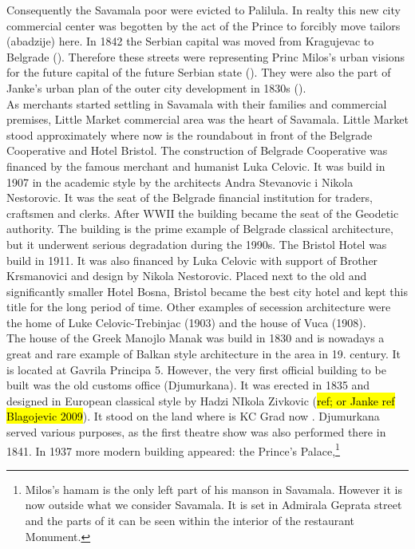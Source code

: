 \documentclass[11pt]{report}
\begin{document}
Consequently the Savamala poor were evicted to Palilula. 
In realty this new city commercial center was begotten by the act of the Prince to forcibly move tailors (abadzije) here.
In 1842 the Serbian capital was moved from Kragujevac to Belgrade (\cite{Roter Blagojevic in Doytchinov 2015}).
Therefore these streets were representing Princ Milos’s urban visions for the future capital of the future Serbian state (\cite{Roter Blagojevic in Doytchinov 2015}).
They were also the part of Janke’s urban plan of the outer city development in 1830s (\cite{Blagojevic 2009}). 
\\
As merchants started settling in Savamala with their families and commercial premises, Little Market commercial area was the heart of Savamala.
Little Market stood approximately where now is the roundabout in front of the Belgrade Cooperative and Hotel Bristol.
The construction of Belgrade Cooperative was financed by the famous merchant and humanist Luka Celovic.
It was build in 1907 in the academic style by the architects Andra Stevanovic i Nikola Nestorovic.
It was the seat of the Belgrade financial institution for traders, craftsmen and clerks.
After WWII the building became the seat of the Geodetic authority.
The building is the prime example of Belgrade classical architecture, but it underwent serious degradation during the 1990s.
The Bristol Hotel was build in 1911.
It was also financed by Luka Celovic with support of Brother Krsmanovici and design by Nikola Nestorovic. Placed next to the old and significantly smaller Hotel Bosna, Bristol became the best city hotel and kept this title for the long period of time.
Other examples of secession architecture were the home of Luke Celovic-Trebinjac (1903) and the house of Vuca (1908).
\\
The house of the Greek Manojlo Manak was build in 1830 and is nowadays a great and rare example of Balkan style architecture in the area in 19. century. It is located at Gavrila Principa 5.
However, the very first official building to be built was the old customs office (Djumurkana). It was erected in 1835 and designed in European classical style by Hadzi NIkola Zivkovic (\hl{ref; or Janke ref Blagojevic 2009}). It stood on the land where is KC Grad now . Djumurkana served various purposes, as the first theatre show was also performed there in 1841.
In 1937 more modern building appeared: the Prince's Palace,\footnote{Milos's hamam is the only left part of his manson in Savamala. However it is now outside what we consider Savamala. It is set in Admirala Geprata street and the parts of it can be seen within the interior of the restaurant Monument.}
\end{document}
